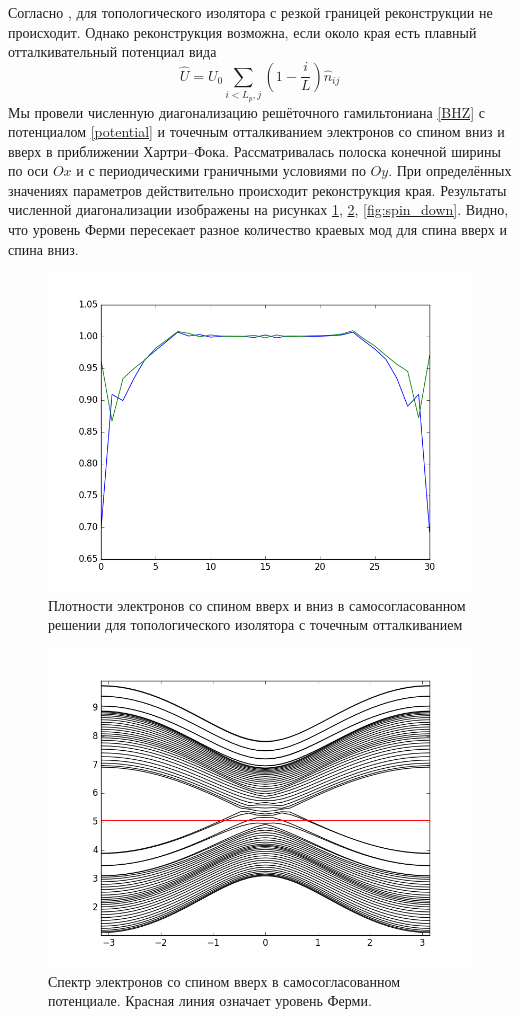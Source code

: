 Согласно \cite{Wang2017}, для топологического изолятора с резкой границей реконструкции 
не происходит. Однако реконструкция возможна, если около края есть плавный отталкивательный
потенциал вида
\begin{equation}
    \label{potential}
    \hat{U} = U_0\sum_{i<L_p,j} \left(1 - \frac{i}{L}\right)\hat{n}_{ij}
\end{equation}
Мы провели численную диагонализацию решёточного гамильтониана \eqref{BHZ} 
с потенциалом \eqref{potential} и точечным отталкиванием электронов со спином вниз 
и вверх в приближении Хартри--Фока. Рассматривалась полоска конечной ширины по оси $Ox$ 
и с периодическими граничными условиями по $Oy$.
При определённых значениях параметров действительно происходит реконструкция края. Результаты
численной диагонализации изображены на рисунках 
\ref{fig:rec_potential}, \ref{fig:spin_up}, \ref{fig:spin_down}. Видно, что 
уровень Ферми пересекает разное количество краевых мод для спина 
вверх и спина вниз.
\begin{figure}
    \centering
    \includegraphics[width=0.8\linewidth]{reconstruction_potential.png}
    \caption{
            Плотности электронов со спином вверх и вниз в самосогласованном решении
            для топологического изолятора с точечным отталкиванием
            }
    \label{fig:rec_potential}
\end{figure}
\begin{figure}
    \centering
    \includegraphics[width=0.8\linewidth]{reconstruction_spectrum_up.png}
    \caption{
            Спектр электронов со спином вверх в самосогласованном потенциале. Красная 
            линия означает уровень Ферми.
            }
    \label{fig:spin_up}
\end{figure}
